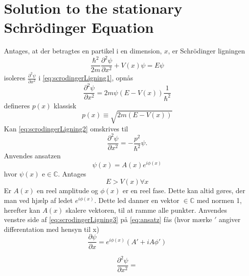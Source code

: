 \section{Solution to the stationary Schrödinger Equation}
Antages, at der betragtes en partikel i en dimension, $x$,  er Schrödinger ligningen
\begin{equation}
    \frac{\hbar^2}{2m}\frac{\partial^2 \psi}{\partial x^2} + V(x) \psi = E \psi
    \label{eq:scrodingerLigning1}
\end{equation}
isoleres $\frac{\partial^2 \psi}{\partial x^2}$ i \cref{eq:scrodingerLigning1}, opnås
\begin{equation}
    \frac{\partial^2 \psi}{\partial x^2} = 2m\psi (E  - V(x)) \frac{1}{\hbar^2}
    \label{eq:scrodingerLigning2}
\end{equation}
defineres $p(x)$ klassisk
\begin{equation}
p(x) \equiv \sqrt{2m(E-V(x))}
\end{equation}
Kan \cref{eq:scrodingerLigning2} omskrives til
\begin{equation}
    \frac{\partial^2 \psi}{\partial x^2} = - \frac{p^2}{\hbar^2} \psi.
    \label{eq:scrodingerLigning3}
\end{equation}
Anvendes ansatzen
\begin{equation}
    \psi(x) = A(x) e^{i \phi(x)}
    \label{eq:ansatz}
\end{equation}
hvor $\psi (x)$ e$ \in \mathbb{C}$. Antages
\begin{equation}
 E > V(x) \forall x
\end{equation}
Er $A(x)$ en reel amplitude og $\phi(x)$ er en reel fase. Dette kan altid gøres, der man ved hjælp af ledet  $e^{i \phi(x)} $. Dette led danner en vektor $ \in \mathbb{C}$ med normen 1, herefter kan $A(x)$  skalere vektoren, til at ramme alle punkter. Anvendes venstre side af \cref{eq:scrodingerLigning3} på \cref{eq:ansatz} fås (hvor mærke $'$ angiver differentation med hensyn til x)
\begin{equation}
    \frac{\partial \psi}{\partial x} = e^{i \phi(x)}(A' + iA\phi ')
    \label{eq:diff1gange}
\end{equation}

\begin{equation}
    \frac{\partial^2 \psi}{\partial x^2} =
    \label{eq:diff2gange}
\end{equation}
